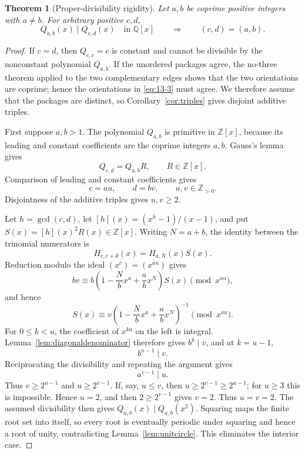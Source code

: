 \documentclass[11pt]{article}
\numberwithin{equation}{section}
\newtheorem{theorem}{Theorem}[section]
\theoremstyle{definition}
\newcommand{\Q}{\mathbb Q}
\newcommand{\Z}{\mathbb Z}
\begin{document}
\begin{theorem}[Proper-divisibility rigidity]\label{thm:nodivision}
Let \(a,b\) be coprime positive integers with \(a\neq b\).  For arbitrary
positive \(c,d\),
\begin{equation}
 Q_{a,b}(x)\mid Q_{c,d}(x)\quad\text{in }\Q[x]
 \qquad\Longrightarrow\qquad(c,d)=(a,b).
 \label{eq:13-3}
\end{equation}
\end{theorem}

\begin{proof}
If \(c=d\), then \(Q_{c,c}=c\) is constant and cannot be divisible by the
nonconstant polynomial \(Q_{a,b}\).  If the unordered packages agree, the
no-three theorem applied to the two
complementary edges shows that the two orientations are coprime; hence the
orientations in \eqref{eq:13-3} must agree.  We therefore assume that the packages
are distinct, so Corollary~\ref{cor:triples} gives disjoint additive triples.

First suppose \(a,b>1\).  The polynomial \(Q_{a,b}\) is primitive in
\(\Z[x]\), because its leading and constant coefficients are the coprime
integers \(a,b\).  Gauss's lemma gives
\[
 Q_{c,d}=Q_{a,b}R,\qquad R\in\Z[x].
\]
Comparison of leading and constant coefficients gives
\begin{equation}
 c=au,\qquad d=bv,\qquad u,v\in\Z_{>0}.
 \label{eq:13-4}
\end{equation}
Disjointness of the additive triples gives \(u,v\geq2\).

Let \(h=\gcd(c,d)\), let \([h](x)=(x^h-1)/(x-1)\), and put
\(S(x)=[h](x)^2R(x)\in\Z[x]\).  Writing \(N=a+b\), the identity between
the trinomial numerators is
\[
 H_{c,c+d}(x)=H_{a,N}(x)S(x).
\]
Reduction modulo the ideal \((x^{c})=(x^{au})\) gives
\[
 b v\equiv
 b\left(1-\frac Nb x^a+\frac ab x^N\right)S(x)
 \pmod{x^{au}},
\]
and hence
\begin{equation}
 S(x)\equiv
 v\left(1-\frac Nb x^a+\frac ab x^N\right)^{-1}
 \pmod{x^{au}}.
 \label{eq:13-5}
\end{equation}
For \(0\leq k<u\), the coefficient of \(x^{ka}\) on the left is integral.
Lemma~\ref{lem:diagonaldenominator} therefore gives \(b^k\mid v\), and at
\(k=u-1\),
\begin{equation}
 b^{u-1}\mid v.
 \label{eq:13-6}
\end{equation}
Reciprocating the divisibility and repeating the argument gives
\begin{equation}
 a^{v-1}\mid u.
 \label{eq:13-7}
\end{equation}
Thus \(v\geq2^{u-1}\) and \(u\geq2^{v-1}\).  If, say,
\(u\leq v\), then \(u\geq2^{v-1}\geq2^{u-1}\); for \(u\geq3\) this is
impossible.  Hence \(u=2\), and then \(2\geq2^{v-1}\) gives \(v=2\).
Thus \(u=v=2\).  The
assumed divisibility then gives
\(Q_{a,b}(x)\mid Q_{a,b}(x^2)\).  Squaring maps the finite root set into
itself, so every root is eventually periodic under squaring and hence a root
of unity, contradicting Lemma~\ref{lem:unitcircle}.  This eliminates the
interior case.


\end{proof}
\end{document}
